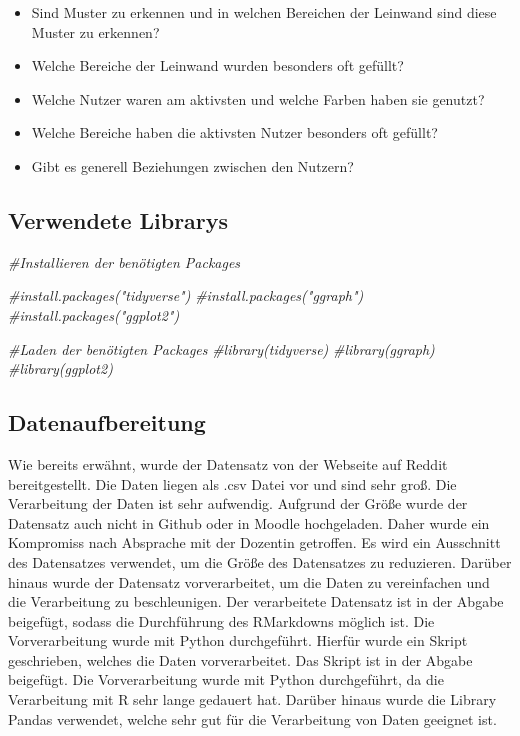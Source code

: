 \documentclass[
]{article}
\newenvironment{Shaded}{\begin{snugshade}}{\end{snugshade}}
\newcommand{\CommentTok}[1]{\textcolor[rgb]{0.56,0.35,0.01}{\textit{#1}}}
\providecommand{\tightlist}{%
  \setlength{\itemsep}{0pt}\setlength{\parskip}{0pt}}
\begin{document}
\begin{itemize}
\tightlist
\item
  Sind Muster zu erkennen und in welchen Bereichen der Leinwand sind
  diese Muster zu erkennen?
\item
  Welche Bereiche der Leinwand wurden besonders oft gefüllt?
\item
  Welche Nutzer waren am aktivsten und welche Farben haben sie genutzt?
\item
  Welche Bereiche haben die aktivsten Nutzer besonders oft gefüllt?
\item
  Gibt es generell Beziehungen zwischen den Nutzern?
\end{itemize}

\subsection{Verwendete Librarys}\label{verwendete-librarys}

\begin{Shaded}
\begin{Highlighting}[]
\CommentTok{\#Installieren der benötigten Packages}

\CommentTok{\#install.packages("tidyverse")}
\CommentTok{\#install.packages("ggraph")}
\CommentTok{\#install.packages("ggplot2")}

\CommentTok{\#Laden der benötigten Packages}
\CommentTok{\#library(tidyverse)}
\CommentTok{\#library(ggraph)}
\CommentTok{\#library(ggplot2)}
\end{Highlighting}
\end{Shaded}

\subsection{Datenaufbereitung}\label{datenaufbereitung}

Wie bereits erwähnt, wurde der Datensatz von der Webseite auf Reddit
bereitgestellt. Die Daten liegen als .csv Datei vor und sind sehr groß.
Die Verarbeitung der Daten ist sehr aufwendig. Aufgrund der Größe wurde
der Datensatz auch nicht in Github oder in Moodle hochgeladen. Daher
wurde ein Kompromiss nach Absprache mit der Dozentin getroffen. Es wird
ein Ausschnitt des Datensatzes verwendet, um die Größe des Datensatzes
zu reduzieren. Darüber hinaus wurde der Datensatz vorverarbeitet, um die
Daten zu vereinfachen und die Verarbeitung zu beschleunigen. Der
verarbeitete Datensatz ist in der Abgabe beigefügt, sodass die
Durchführung des RMarkdowns möglich ist. Die Vorverarbeitung wurde mit
Python durchgeführt. Hierfür wurde ein Skript geschrieben, welches die
Daten vorverarbeitet. Das Skript ist in der Abgabe beigefügt. Die
Vorverarbeitung wurde mit Python durchgeführt, da die Verarbeitung mit R
sehr lange gedauert hat. Darüber hinaus wurde die Library Pandas
verwendet, welche sehr gut für die Verarbeitung von Daten geeignet ist.
\end{document}
